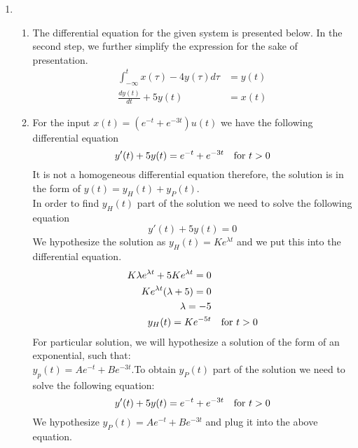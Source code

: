 \documentclass[10pt,a4paper, margin=1in]{article}
\begin{document}
\begin{enumerate}
\item %
    \begin{enumerate}
    \item %
    The differential equation for the given system is presented below. In the second step, we further simplify the expression for the sake of presentation.
    \begin{equation}
	\begin{split}
		\int_{-\infty}^{t} x(\tau) - 4y(\tau) d \tau & = y(t)\\
		\frac{dy(t)}{dt} + 5y(t) & = x(t)
	\end{split}
	\end{equation} 
    \item %
    	For the input $x(t)=(e^{-t}+e^{-3t})u(t)$ we have the following differential equation 
	\begin{equation}
	y'(t) + 5y(t) = e^{-t}+e^{-3t} \text{\quad for } t > 0 
	\end{equation}
	It is not a homogeneous differential equation therefore, the solution is in the form of $y(t)=y_H(t)+y_P(t)$. \\
	In order to find $y_H(t)$ part of the solution we need to solve the following equation
	\begin{equation}
	 y'(t) + 5y(t) =0
	\end{equation}
	We hypothesize the solution as $y_H(t)=Ke^{\lambda t}$ and we put this into the differential equation. \\
    	\begin{equation}
	\begin{split}
		K\lambda e^{\lambda t} + 5 K e^{\lambda t} = 0 & \\
	Ke^{\lambda t} (\lambda + 5) = 0 & \\
		\lambda = -5 & \\
		y_H(t) = Ke^{-5t} &\text{\quad for } t>0 
	\end{split}
	\end{equation}	
	For particular solution, we will hypothesize a solution of the form of an exponential, such that: \\$y_p(t) = Ae^{-t}+Be^{-3t}$.To obtain $y_P(t)$ part of the solution we need to solve the following equation: 
	\begin{equation}
	y'(t)+5y(t)=e^{-t} + e^{-3t} \text{\quad for } t>0
	\end{equation}
	We hypothesize $y_{P}(t)=Ae^{-t}+Be^{-3t}$ and plug it into the above equation.

\end{enumerate}
\end{enumerate}
\end{document}
